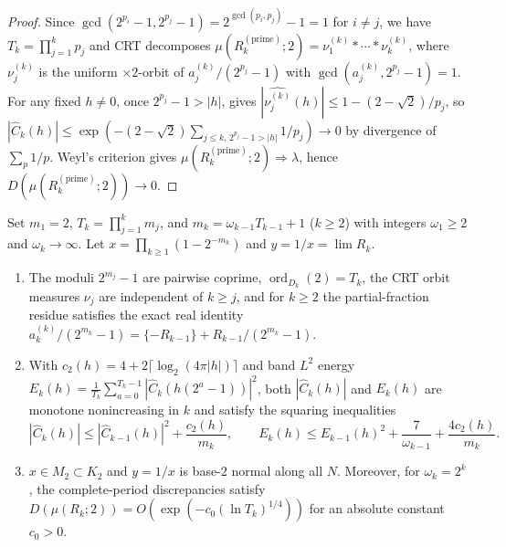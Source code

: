 \documentclass[11pt]{article}
\newcommand{\fr}[1]{\{#1\}}
\DeclareMathOperator{\ord}{ord}
\begin{document}
\begin{proof}
Since $\gcd(2^{p_i}-1,2^{p_j}-1)=2^{\gcd(p_i,p_j)}-1=1$ for $i\neq j$, we have $T_k=\prod_{j=1}^k p_j$ and CRT decomposes $\mu(R_k^{(\mathrm{prime})};2)=\nu_1^{(k)}*\cdots*\nu_k^{(k)}$, where $\nu_j^{(k)}$ is the uniform $\times2$-orbit of $a_j^{(k)}/(2^{p_j}-1)$ with $\gcd(a_j^{(k)},2^{p_j}-1)=1$. For any fixed $h\neq0$, once $2^{p_j}-1>|h|$,  gives $|\widehat{\nu_j^{(k)}}(h)|\le 1-(2-\sqrt2)/p_j$, so $|\widehat C_k(h)|\le\exp(-(2-\sqrt2)\sum_{j\le k,\,2^{p_j}-1>|h|}1/p_j)\to0$ by divergence of $\sum_p 1/p$. Weyl's criterion gives $\mu(R_k^{(\mathrm{prime})};2)\Rightarrow\lambda$, hence $D(\mu(R_k^{(\mathrm{prime})};2))\to0$.
\end{proof}

\begin{theorem}\label{thm:fully-coprime}
Set $m_1=2$, $T_k=\prod_{j=1}^k m_j$, and $m_k=\omega_{k-1}T_{k-1}+1$ ($k\ge2$) with integers $\omega_1\ge2$ and $\omega_k\to\infty$. Let $x=\prod_{k\ge1}(1-2^{-m_k})$ and $y=1/x=\lim R_k$.
\begin{enumerate}[label=\textup{(\roman*)},nosep]
\item The moduli $2^{m_j}-1$ are pairwise coprime, $\ord_{D_k}(2)=T_k$, the CRT orbit measures $\nu_j$ are independent of $k\ge j$, and for $k\ge2$ the partial-fraction residue satisfies the exact real identity $a_k^{(k)}/(2^{m_k}-1)=\fr{-R_{k-1}}+R_{k-1}/(2^{m_k}-1)$.
\item With $c_2(h)=4+2\lceil\log_2(4\pi|h|)\rceil$ and band $L^2$ energy $E_k(h)=\frac1{T_k}\sum_{a=0}^{T_k-1}|\widehat C_k(h(2^a-1))|^2$, both $|\widehat C_k(h)|$ and $E_k(h)$ are monotone nonincreasing in $k$ and satisfy the squaring inequalities
\[
|\widehat C_k(h)|\le|\widehat C_{k-1}(h)|^2+\frac{c_2(h)}{m_k},\qquad
E_k(h)\le E_{k-1}(h)^2+\frac{7}{\omega_{k-1}}+\frac{4c_2(h)}{m_k}.
\]
\item $x\in M_2\subset K_2$ and $y=1/x$ is base-$2$ normal along all $N$. Moreover, for $\omega_k=2^k$, the complete-period discrepancies satisfy $D(\mu(R_k;2))=O(\exp(-c_0(\ln T_k)^{1/4}))$ for an absolute constant $c_0>0$.
\end{enumerate}
\end{theorem}
\end{document}

